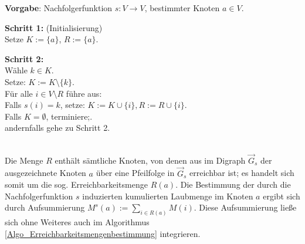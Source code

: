 \begin{algo} \label{Algo_Erreichbarkeitsmengenbestimmung}
\textbf{Vorgabe}: Nachfolgerfunktion $s:V\rightarrow V$, bestimmter Knoten $a \in V$.

\noindent 
\textbf{Schritt 1:} (Initialisierung)\\
\phantom \quad Setze $K := \{a\}$, $R := \{a\}$.

\noindent 
\textbf{Schritt 2:}\\
\phantom \quad Wähle $k \in K$. \\
\phantom \quad Setze: $K := K\setminus \{k\}$. \\
\phantom \quad Für alle $i \in V\setminus R$ führe aus:\\
\phantom \quad \qquad Falls $s(i) = k$, setze: $K := K \cup \{i\}, R := R \cup \{i\}$.\\
\phantom \quad Falls $K = \emptyset$, terminiere;.\\
\phantom \quad andernfalls gehe zu Schritt 2.
\end{algo}


\phantom \\
\noindent Die Menge $R$ enthält sämtliche Knoten, von denen aus im Digraph $\vec{G}_s$ der ausgezeichnete Knoten $a$ über eine Pfeilfolge in $\vec{G}_s$ erreichbar ist; es handelt sich somit um die sog. Erreichbarkeitsmenge $R(a)$. Die Bestimmung der durch die Nachfolgerfunktion $s$ induzierten kumulierten Laubmenge im Knoten $a$ ergibt sich durch Aufsummierung $M^s(a) := \sum\limits_{i \in R(a)}M(i)$. Diese Aufsummierung ließe sich ohne Weiteres auch im Algorithmus \ref{Algo_Erreichbarkeitsmengenbestimmung} integrieren.\\

